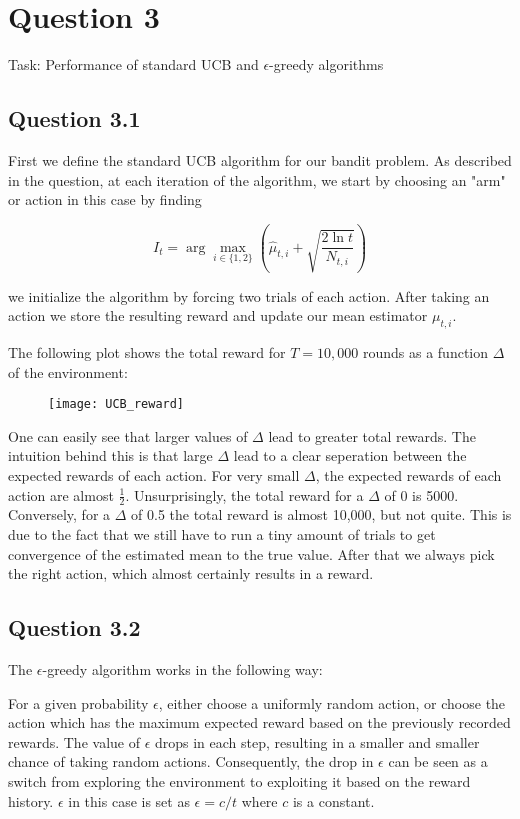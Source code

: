 \documentclass[a4paper, 11pt]{article} %
\begin{document}
\clearpage

\section*{Question 3}

Task: Performance of standard UCB and $\epsilon$-greedy algorithms

\subsection*{Question 3.1}

First we define the standard UCB algorithm for our bandit problem. As described in the question, at each iteration of the algorithm, we start by choosing an "arm" or action in this case by finding

$$I_{t}=\arg \max _{i \in\{1,2\}}\left(\widehat{\mu}_{t, i}+\sqrt{\frac{2 \ln t}{N_{t, i}}}\right)$$

we initialize the algorithm by forcing two trials of each action. After taking an action we store the resulting reward and update our mean estimator $\mu_{t,i}$.

The following plot shows the total reward for $T=10,000$ rounds as a function $\Delta$ of the environment:

\begin{figure}[H]
	\centering
	\texttt{[image: UCB\_reward]}
	\caption{}
\end{figure}

One can easily see that larger values of $\Delta$ lead to greater total rewards. The intuition behind this is that large $\Delta$ lead to a clear seperation between the expected rewards of each action. For very small $\Delta$, the expected rewards of each action are almost $\frac{1}{2}$. Unsurprisingly, the total reward for a $\Delta$ of 0 is 5000. Conversely, for a $\Delta$ of 0.5 the total reward is almost 10,000, but not quite. This is due to the fact that we still have to run a tiny amount of trials to get convergence of the estimated mean to the true value. After that we always pick the right action, which almost certainly results in a reward.

\subsection*{Question 3.2}

The $\epsilon$-greedy algorithm works in the following way:

For a given probability $\epsilon$, either choose a uniformly random action, or choose the action which has the maximum expected reward based on the previously recorded rewards. The value of $\epsilon$ drops in each step, resulting in a smaller and smaller chance of taking random actions. Consequently, the drop in $\epsilon$ can be seen as a switch from exploring the environment to exploiting it based on the reward history. $\epsilon$ in this case is set as $\epsilon = c/t$ where $c$ is a constant.
\end{document}
